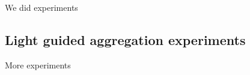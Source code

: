 We did experiments


\subsection{Light guided aggregation experiments}
\label{sec:mblocksExperimentsLight}

More experiments
